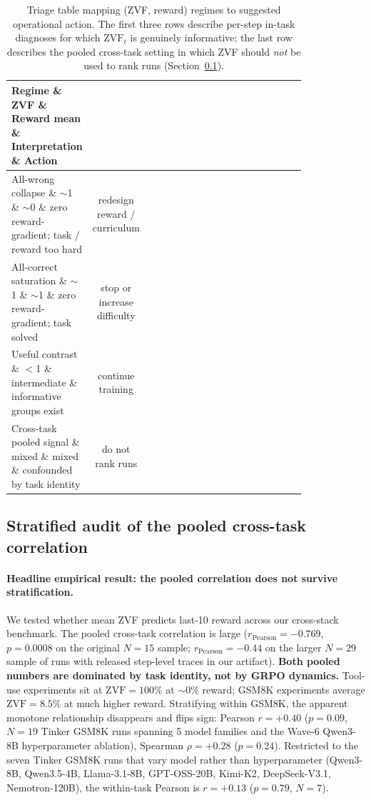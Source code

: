 \documentclass{article}
\begin{document}
\begin{table}[t]
\centering\small
\setlength{\tabcolsep}{5pt}
\begin{tabular}{p{0.22\linewidth}cp{0.13\linewidth}p{0.27\linewidth}p{0.20\linewidth}}
\toprule
\textbf{Regime} \& \textbf{ZVF} \& \textbf{Reward mean} \& \textbf{Interpretation} \& \textbf{Action} \\
\midrule
All-wrong collapse \& $\sim$1 \& $\sim$0 \& zero reward-gradient; task / reward too hard &
redesign reward / curriculum \\
All-correct saturation \& $\sim$1 \& $\sim$1 \& zero reward-gradient; task solved &
stop or increase difficulty \\
Useful contrast \& $<$1 \& intermediate \& informative groups exist &
continue training \\
Cross-task pooled signal \& mixed \& mixed \& confounded by task identity &
do not rank runs \\
\bottomrule
\end{tabular}
\caption{Triage table mapping (ZVF, reward) regimes to suggested
operational action. The first three rows describe per-step in-task
diagnoses for which $\mathrm{ZVF}_t$ is genuinely informative; the last
row describes the pooled cross-task setting in which ZVF should
\emph{not} be used to rank runs (Section~\ref{sec:zvf-stratification}).}
\label{tab:zvf-triage}
\end{table}

\subsection{Stratified audit of the pooled cross-task correlation}
\label{sec:zvf-stratification}
\label{sec:zvf-analysis}

\paragraph{Headline empirical result: the pooled correlation does not
survive stratification.}
We tested whether mean ZVF predicts last-10 reward across our cross-stack
benchmark. The pooled cross-task correlation is large ($r_{\text{Pearson}}
= -0.769$, $p = 0.0008$ on the original $N{=}15$ sample;
$r_{\text{Pearson}} = -0.44$ on the larger $N{=}29$ sample of runs with
released step-level traces in our artifact). \textbf{Both pooled numbers
are dominated by task identity, not by GRPO dynamics.} Tool-use experiments
sit at $\mathrm{ZVF} = 100\%$ at $\sim$0\% reward; GSM8K experiments
average $\mathrm{ZVF} = 8.5\%$ at much higher reward. Stratifying within
GSM8K, the apparent monotone relationship disappears and flips sign:
Pearson $r = +0.40$ ($p = 0.09$, $N{=}19$ Tinker GSM8K runs spanning 5
model families and the Wave-6 Qwen3-8B hyperparameter ablation), Spearman
$\rho = +0.28$ ($p = 0.24$). Restricted to the seven Tinker GSM8K runs that
vary model rather than hyperparameter (Qwen3-8B, Qwen3.5-4B,
Llama-3.1-8B, GPT-OSS-20B, Kimi-K2, DeepSeek-V3.1, Nemotron-120B), the
within-task Pearson is $r = +0.13$ ($p = 0.79$, $N{=}7$).
\end{document}
